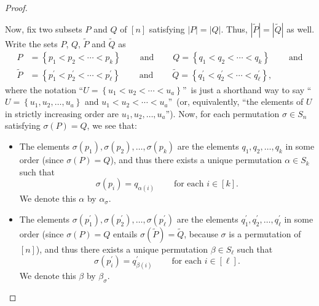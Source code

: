 \begin{proof}
\begin{fineprint}
Now, fix two subsets $P$ and $Q$ of $\left[  n\right]  $ satisfying
$\left\vert P\right\vert =\left\vert Q\right\vert $. Thus, $\left\vert
\widetilde{P}\right\vert =\left\vert \widetilde{Q}\right\vert $ as well. Write
the sets $P$, $Q$, $\widetilde{P}$ and $\widetilde{Q}$ as%
\begin{align*}
P  &  =\left\{  p_{1}<p_{2}<\cdots<p_{k}\right\}
\ \ \ \ \ \ \ \ \ \ \text{and}\ \ \ \ \ \ \ \ \ \ Q=\left\{  q_{1}%
<q_{2}<\cdots<q_{k}\right\}  \ \ \ \ \ \ \ \ \ \ \text{and}\\
\widetilde{P}  &  =\left\{  p_{1}^{\prime}<p_{2}^{\prime}<\cdots<p_{\ell
}^{\prime}\right\}  \ \ \ \ \ \ \ \ \ \ \text{and}%
\ \ \ \ \ \ \ \ \ \ \widetilde{Q}=\left\{  q_{1}^{\prime}<q_{2}^{\prime
}<\cdots<q_{\ell}^{\prime}\right\}  ,
\end{align*}
where the notation \textquotedblleft$U=\left\{  u_{1}<u_{2}<\cdots
<u_{a}\right\}  $\textquotedblright\ is just a shorthand way to say
\textquotedblleft$U=\left\{  u_{1},u_{2},\ldots,u_{a}\right\}  $ and
$u_{1}<u_{2}<\cdots<u_{a}$\textquotedblright\ (or, equivalently,
\textquotedblleft the elements of $U$ in strictly increasing order are
$u_{1},u_{2},\ldots,u_{a}$\textquotedblright). Now, for each permutation
$\sigma\in S_{n}$ satisfying $\sigma\left(  P\right)  =Q$, we see that:

\begin{itemize}
\item The elements $\sigma\left(  p_{1}\right)  ,\sigma\left(  p_{2}\right)
,\ldots,\sigma\left(  p_{k}\right)  $ are the elements $q_{1},q_{2}%
,\ldots,q_{k}$ in some order (since $\sigma\left(  P\right)  =Q$), and thus
there exists a unique permutation $\alpha\in S_{k}$ such that
\[
\sigma\left(  p_{i}\right)  =q_{\alpha\left(  i\right)  }%
\ \ \ \ \ \ \ \ \ \ \text{for each }i\in\left[  k\right]  .
\]
We denote this $\alpha$ by $\alpha_{\sigma}$.

\item The elements $\sigma\left(  p_{1}^{\prime}\right)  ,\sigma\left(
p_{2}^{\prime}\right)  ,\ldots,\sigma\left(  p_{\ell}^{\prime}\right)  $ are
the elements $q_{1}^{\prime},q_{2}^{\prime},\ldots,q_{\ell}^{\prime}$ in some
order (since $\sigma\left(  P\right)  =Q$ entails $\sigma\left(
\widetilde{P}\right)  =\widetilde{Q}$, because $\sigma$ is a permutation of
$\left[  n\right]  $), and thus there exists a unique permutation $\beta\in
S_{\ell}$ such that%
\[
\sigma\left(  p_{i}^{\prime}\right)  =q_{\beta\left(  i\right)  }^{\prime
}\ \ \ \ \ \ \ \ \ \ \text{for each }i\in\left[  \ell\right]  .
\]
We denote this $\beta$ by $\beta_{\sigma}$.
\end{itemize}


\end{fineprint}
\end{proof}
